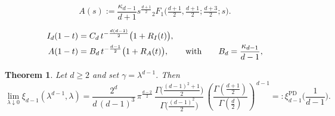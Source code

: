 \documentclass[10pt,a4paper]{amsart}
\newtheorem{theorem}{Theorem}
\begin{document}
\begin{equation}\label{eq:A}
	A(s) := \frac{\kappa_{d-1}}{d+1} s^{\frac{d+1}{2}}
		{}_2F_1\!\Big(\tfrac{d+1}{2},\tfrac{d+1}{2};\tfrac{d+3}{2};s\Big).
\end{equation}

\begin{align}
	I_d(1-t) & = C_d \, t^{-\frac{d(d-1)}{2}} \big(1 + R_I(t)\big),  \notag                                                                   \\
	A(1-t)   & = B_d \, t^{-\frac{d-1}{2}} \big(1 + R_A(t)\big), \qquad \text{with}\qquad B_d = \frac{\kappa_{d-1}}{d-1},\label{eq:Aestimate}
\end{align}

\begin{theorem}\label{thm:AsymptoticsGeneralD}
	Let $d\geq 2$ and set $\gamma=\lambda^{d-1}$. Then
	\[
		\lim_{\lambda\downarrow0}\xi_{d-1}(\lambda^{d-1},\lambda)
		=
		\frac{2^{d}}{d\,(d-1)^3}\,
		\pi^{\frac{d-2}{2}}\,
		\frac{\Gamma\!\big(\frac{(d-1)^2+1}{2}\big)}{\Gamma\!\big(\frac{(d-1)^2}{2}\big)}\,
		\left(\frac{\Gamma(\frac{d+1}{2})}{\Gamma(\frac d2)}\right)^{\,d-1}=:\xi_{d-1}^{\operatorname{PD}}\Big(\frac{1}{d-1}\Big).
	\]
\end{theorem}
\end{document}
